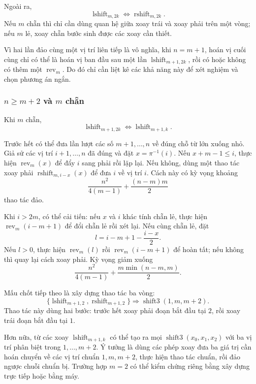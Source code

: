 \documentclass[11pt]{article}
\begin{document}
Ngoài ra,
\[
  \operatorname{lshift}_{m,2k}\Leftrightarrow
  \operatorname{rshift}_{m,2k}.
\]
Nếu $m$ chẵn thì chỉ cần dùng quan hệ giữa xoay trái và xoay phải trên một vòng;
nếu $m$ lẻ, xoay chẵn bước sinh được các xoay cần thiết.

Vì hai lần đảo cùng một vị trí liên tiếp là vô nghĩa, khi $n=m+1$, hoán vị cuối
cùng chỉ có thể là hoán vị ban đầu sau một lần
$\operatorname{lshift}_{m+1,2k}$, rồi có hoặc không có thêm một
$\operatorname{rev}_m$. Do đó chỉ cần liệt kê các khả năng này để xét nghiệm và
chọn phương án ngắn.

\subsubsection{\texorpdfstring{\(n\ge m+2\) và \(m\) chẵn}{n>=m+2 và m chẵn}}

Khi $m$ chẵn,
\[
  \operatorname{lshift}_{m+1,2k}\Leftrightarrow
  \operatorname{lshift}_{m+1,k}.
\]

Trước hết có thể đưa lần lượt các số $m+1,\ldots,n$ về đúng chỗ từ lớn xuống
nhỏ. Giả sử các vị trí $i+1,\ldots,n$ đã đúng và đặt $x=\pi^{-1}(i)$. Nếu
$x+m-1\le i$, thực hiện $\operatorname{rev}_m(x)$ để đẩy $i$ sang phải rồi lặp
lại. Nếu không, dùng một thao tác xoay phải
$\operatorname{rshift}_{m,i-x}(x)$ để đưa $i$ về vị trí $i$. Cách này có kỳ vọng
khoảng
\[
  \frac{n^2}{4(m-1)}+\frac{(n-m)m}{2}
\]
thao tác đảo.

Khi $i>2m$, có thể cải tiến: nếu $x$ và $i$ khác tính chẵn lẻ, thực hiện
$\operatorname{rev}_m(i-m+1)$ để đổi chẵn lẻ rồi xét lại. Nếu cùng chẵn lẻ, đặt
\[
  l=i-m+1-\frac{i-x}{2}.
\]
Nếu $l>0$, thực hiện $\operatorname{rev}_m(l)$ rồi
$\operatorname{rev}_m(i-m+1)$ để hoàn tất; nếu không thì quay lại cách xoay phải.
Kỳ vọng giảm xuống
\[
  \frac{n^2}{4(m-1)}+\frac{m\min(n-m,m)}2.
\]

Mấu chốt tiếp theo là xây dựng thao tác ba vòng:
\[
  \{\operatorname{lshift}_{m+1,2},\operatorname{rshift}_{m+1,2}\}
  \Rightarrow \operatorname{shift3}(1,m,m+2).
\]
Thao tác này dùng hai bước: trước hết xoay phải đoạn bắt đầu tại $2$, rồi xoay
trái đoạn bắt đầu tại $1$.

Hơn nữa, từ các xoay $\operatorname{lshift}_{m+1,k}$ có thể tạo ra mọi
$\operatorname{shift3}(x_0,x_1,x_2)$ với ba vị trí phân biệt trong
$1,\ldots,m+2$. Ý tưởng là dùng các phép xoay đưa ba giá trị cần hoán chuyển về
các vị trí chuẩn $1,m,m+2$, thực hiện thao tác chuẩn, rồi đảo ngược chuỗi chuẩn
bị. Trường hợp $m=2$ có thể kiểm chứng riêng bằng xây dựng trực tiếp hoặc bằng
máy.
\end{document}
